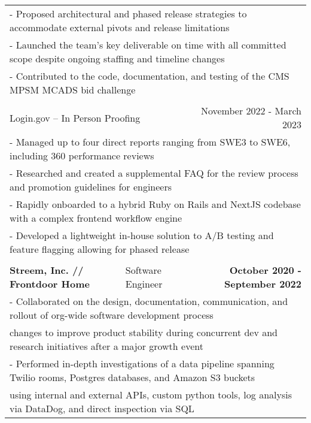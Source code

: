 \documentclass[letterpaper]{article}
\begin{document}
\begin{center}
\begin{tabular}{p{}p{}r}
			  \multicolumn{3}{p{\textwidth}}{\quad\quad - Proposed architectural and phased release strategies to accommodate external pivots and release limitations} \\
			  \multicolumn{3}{p{\textwidth}}{\quad\quad - Launched the team's key deliverable on time with all committed scope despite ongoing staffing and timeline changes} \\
			  \multicolumn{3}{p{\textwidth}}{\quad\quad - Contributed to the code, documentation, and testing of the CMS MPSM MCADS bid challenge } 

		  \\
		  \\
			  \multicolumn{2}{p{0.5\textwidth}}{\quad Login.gov -- In Person Proofing}
			  &
			  {November 2022 - March 2023 \quad\quad\quad\quad}
		  \\
			  \multicolumn{3}{p{\textwidth}}{\quad\quad - Managed up to four direct reports ranging from SWE3 to SWE6, including 360 performance reviews} \\
			  \multicolumn{3}{p{\textwidth}}{\quad\quad - Researched and created a supplemental FAQ for the review process and promotion guidelines for engineers} \\
			  \multicolumn{3}{p{\textwidth}}{\quad\quad - Rapidly onboarded to a hybrid Ruby on Rails and NextJS codebase with a complex frontend workflow engine} \\
			  \multicolumn{3}{p{\textwidth}}{\quad\quad - Developed a lightweight in-house solution to A/B testing and feature flagging allowing for phased release}
		  \\
		  \\
				\textbf{Streem, Inc. // Frontdoor Home} &
				\quad\quad\quad\quad\quad\quad Software Engineer &
				\textbf{October 2020 - September 2022\quad}
			\\
				\multicolumn{3}{p{\textwidth}}{\quad\quad - Collaborated on the design, documentation, communication, and rollout of org-wide software development process}
			\\
				\multicolumn{3}{p{\textwidth}}{\quad\quad\quad changes to improve product stability during concurrent dev and research initiatives after a major growth event} 
			\\
				\multicolumn{3}{p{\textwidth}}{\quad\quad - Performed in-depth investigations of a data pipeline spanning Twilio rooms, Postgres databases, and Amazon S3 buckets}  
			\\
				\multicolumn{3}{p{\textwidth}}{\quad\quad\quad using internal and external APIs, custom python tools, log analysis via DataDog, and direct inspection via SQL}

\end{tabular}
\end{center}
\end{document}
